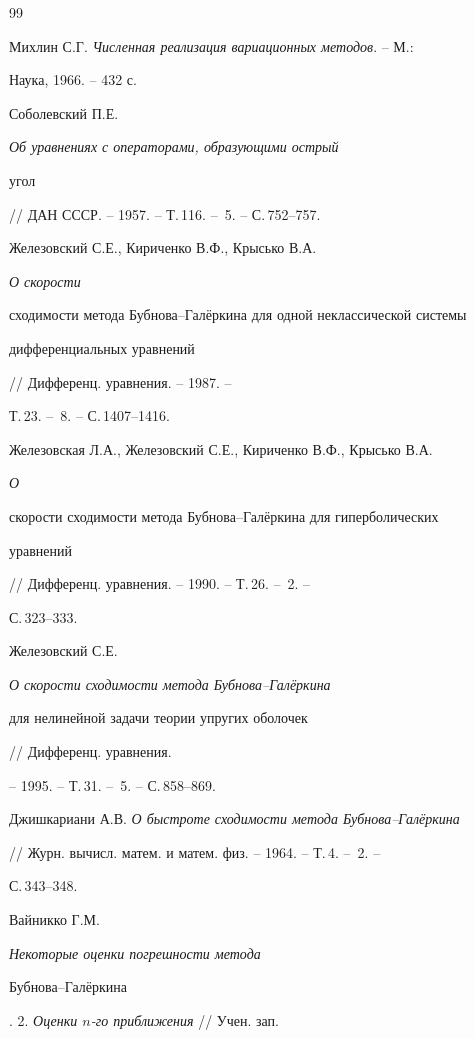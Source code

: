 \begin{thebibliography}{99} 


 




Михлин С.Г. {\em Численная реализация вариационных методов}. -- М.: 


Наука, 1966. -- 432 с. 




Соболевский П.Е. {\em Об уравнениях с операторами, образующими острый 


угол} // ДАН СССР. -- 1957. -- Т.\,116. -- \No\,5. -- С.\,752--757. 




Железовский С.Е., Кириченко В.Ф., Крысько В.А. {\em О скорости 


сходимости метода Бубнова--Гал\"еркина для одной неклассической системы 


дифференциальных уравнений} // Дифференц. уравнения. -- 1987. -- 


Т.\,23. -- \No\,8. -- С.\,1407--1416. 




Железовская Л.А., Железовский С.Е., Кириченко В.Ф., Крысько В.А. {\em О 


скорости сходимости метода Бубнова--Гал\"еркина для гиперболических 


уравнений} // Дифференц. уравнения. -- 1990. -- Т.\,26. -- \No\,2. -- 


С.\,323--333. 




Железовский С.Е. {\em О скорости сходимости метода Бубнова--Гал\"еркина 


для нелинейной задачи теории упругих оболочек} // Дифференц. уравнения. 


-- 1995. -- Т.\,31. -- \No\,5. -- С.\,858--869. 




Джишкариани А.В. {\em О быстроте сходимости метода Бубнова--Гал\"еркина} 


// Журн. вычисл. матем. и матем. физ. -- 1964. -- Т.\,4. -- \No\,2. -- 


С.\,343--348. 




Вайникко Г.М. {\em Некоторые оценки погрешности метода 


Бубнова--Гал\"еркина}. 2. {\em Оценки $n$-го приближения} // Учен. зап. 



\end{thebibliography}
